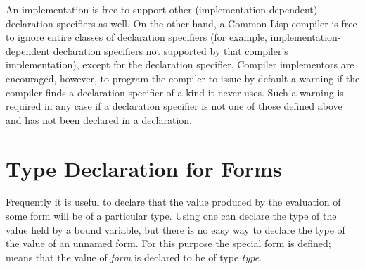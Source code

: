 An implementation is free to support other (implementation-dependent)
declaration specifiers as well.
On the other hand, a Common Lisp compiler is free to
ignore entire classes of declaration specifiers (for example,
implementation-dependent declaration specifiers
not supported by that compiler's
implementation), except for the  declaration specifier.
Compiler implementors are encouraged, however, to
program the compiler to issue by default a warning if the compiler finds
a declaration specifier of a kind it never uses.  Such a warning is required
in any case
if a declaration specifier is not one of those defined above and has not been
declared in a  declaration.

\section{Type Declaration for Forms}

Frequently it is useful to declare that the value produced
by the evaluation of some form will be of a particular type.
Using  one can declare the type of the value
held by a bound variable, but there is no easy way to declare
the type of the value of an unnamed form.  For this purpose the 
special form is defined;  means
that the value of {\it form} is declared to be of type {\it type}.

